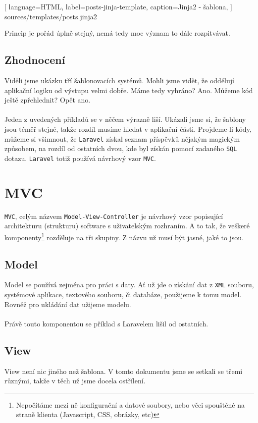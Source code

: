 \documentclass[10pt,a4paper]{article}
\begin{document}
			
			[
				language=HTML,
				label=posts-jinja-template,
				caption={Jinja2 - šablona},
			] {sources/templates/posts.jinja2}
			\vspace{10pt}
			
			Princip je pořád úplně stejný, nemá tedy moc význam to dále rozpitvávat.
			
		\subsection{Zhodnocení}
			Viděli jsme ukázku tří šablonovacích systémů. Mohli jsme vidět, že oddělují aplikační logiku od výstupu velmi dobře. Máme tedy vyhráno? Ano. Můžeme kód ještě zpřehlednit? Opět ano.
			\\
			\\
			Jeden z uvedených příkladů se v něčem výrazně liší. Ukázali jsme si, že šablony jsou téměř stejné, takže rozdíl musíme hledat v aplikační části. Projdeme-li kódy, můžeme si všimnout, že \texttt{Laravel} získal seznam příspěvků nějakým magickým způsobem, na rozdíl od ostatních dvou, kde byl získán pomocí zadaného \texttt{SQL} dotazu. \texttt{Laravel} totiž používá návrhový vzor \texttt{MVC}.

		
	\newpage
	\section{MVC}
		\texttt{MVC}, celým názvem \texttt{Model-View-Controller} je návrhový vzor popisující architekturu (strukturu) software s uživatelským rozhraním. A to tak, že veškeré komponenty\footnote{Nepočítáme mezi ně konfigurační a datové soubory, nebo věci spouštěné na straně klienta (Javascript, CSS, obrázky, etc)} rozděluje na tři skupiny. Z názvu už musí být jasné, jaké to jsou.

		
		\subsection{Model}
			Model se používá zejména pro práci s daty. Ať už jde o získání dat z \texttt{XML} souboru, systémové aplikace, textového souboru, či databáze, použijeme k tomu model. Rovněž pro ukládání dat užijeme modelu.
			\\
			\\
			Právě touto komponentou se příklad s Laravelem lišil od ostatních. 

		\subsection{View}
			View není nic jiného než šablona. V tomto dokumentu jsme se setkali se třemi různými, takže v těch už jsme docela ostřílení.
\end{document}
